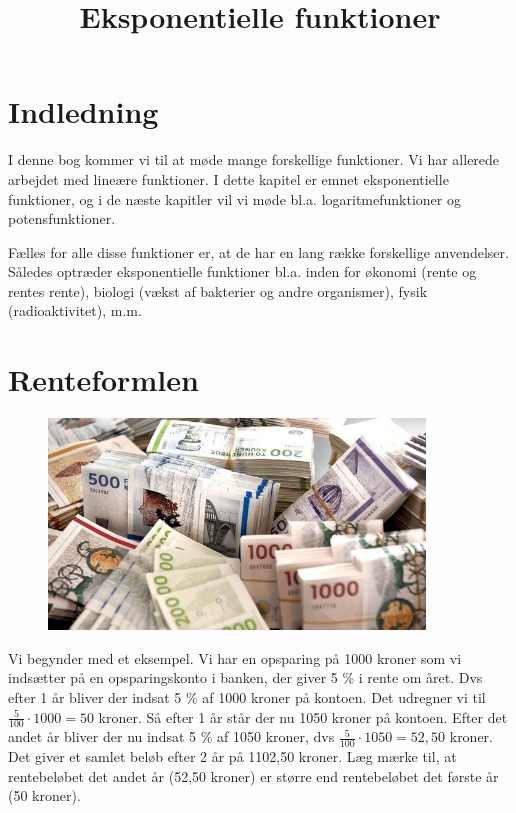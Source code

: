 \documentclass[12pt,oneside,a4paper]{article}
\title{Eksponentielle funktioner}
\date{\vspace{-5ex}}
\begin{document}
\maketitle

\section{Indledning}
I denne bog kommer vi til at møde mange forskellige funktioner. Vi har allerede
arbejdet med lineære funktioner. I dette kapitel er emnet eksponentielle
funktioner, og i de næste kapitler vil vi møde bl.a. logaritmefunktioner og
potensfunktioner.

Fælles for alle disse funktioner er, at de har en lang række forskellige
anvendelser. Således optræder eksponentielle funktioner bl.a. inden for økonomi
(rente og rentes rente), biologi (vækst af bakterier og andre organismer),
fysik (radioaktivitet), m.m.

\section{Renteformlen}
\begin{figure}[ht]
    \centering
    \includegraphics[width=10cm]{penge}
\end{figure}

Vi begynder med et eksempel. Vi har en opsparing på 1000 kroner som vi
indsætter på en opsparingskonto i banken, der giver 5 \% i rente om året. Dvs
efter 1 år bliver der indsat 5 \% af 1000 kroner på kontoen. Det
udregner vi til $ \frac{5}{100} \cdot 1000 = 50 $ kroner. Så efter 1 år står
der nu 1050 kroner på kontoen.  Efter det andet år bliver der nu indsat 5 \% af
1050 kroner, dvs $ \frac{5}{100} \cdot 1050 = 52,50$ kroner.
Det giver et samlet beløb efter 2 år på 1102,50 kroner. Læg mærke til, at
rentebeløbet det andet år (52,50 kroner) er større end rentebeløbet det første
år (50 kroner).
\end{document}
